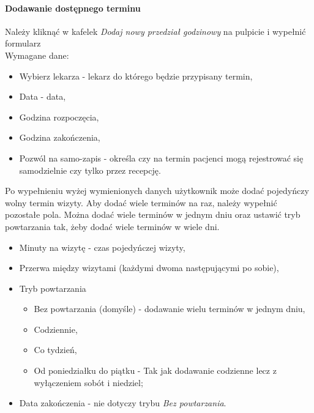 \documentclass[polish,12pt]{aghthesis}
\begin{document}
    \paragraph{Dodawanie dostępnego terminu}{
        Należy kliknąć w kafelek \emph{Dodaj nowy przedział godzinowy} na pulpicie i wypełnić formularz \\
        Wymagane dane:
        \begin{itemize}
            \item Wybierz lekarza - lekarz do którego będzie przypisany termin,
            \item Data - data,
            \item Godzina rozpoczęcia,
            \item Godzina zakończenia,
            \item Pozwól na samo-zapis - określa czy na termin pacjenci mogą rejestrować się samodzielnie czy tylko przez recepcję.
        \end{itemize}
        Po wypełnieniu wyżej wymienionych danych użytkownik może dodać pojedyńczy wolny termin wizyty. Aby dodać wiele terminów na raz, należy wypełnić pozostałe pola. Można dodać wiele terminów  w jednym dniu oraz ustawić tryb powtarzania tak, żeby dodać wiele terminów w wiele dni.
        \begin{itemize}
            \item Minuty na wizytę - czas pojedyńczej wizyty,
            \item Przerwa między wizytami (każdymi dwoma następującymi po sobie),
            \item Tryb powtarzania \begin{itemize}
                \item Bez powtarzania (domyśle) - dodawanie wielu terminów w jednym dniu,
                \item Codziennie,
                \item Co tydzień,
                \item Od poniedziałku do piątku - Tak jak dodawanie codzienne lecz z wyłączeniem sobót i niedziel;
            \end{itemize}
            \item Data zakończenia - nie dotyczy trybu \emph{Bez powtarzania}.
        \end{itemize}
        \begin{figure}[H]

\end{figure}}
\end{document}
